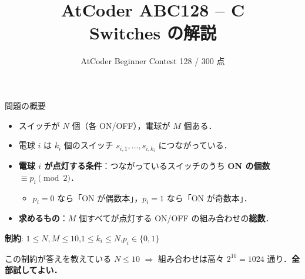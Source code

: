 \documentclass[dvipdfmx,aspectratio=169]{beamer}
\title[ABC128 C]{AtCoder ABC128 -- C\\\small Switches の解説}
\author{}
\date[ABC128]{AtCoder Beginner Contest 128 / 300 点}
\begin{document}
\begin{frame}
  \titlepage
\end{frame}

\begin{frame}{問題の概要}
  \begin{itemize}
    \item スイッチが $N$ 個（各 ON/OFF），電球が $M$ 個ある．
    \item 電球 $i$ は $k_i$ 個のスイッチ $s_{i,1},\ldots,s_{i,k_i}$ につながっている．
    \item \textbf{電球 $i$ が点灯する条件}：つながっているスイッチのうち
      \textbf{ON の個数} $\equiv p_i \pmod 2$．
      \begin{itemize}
        \item $p_i = 0$ なら「ON が偶数本」，$p_i = 1$ なら「ON が奇数本」．
      \end{itemize}
    \item \textbf{求めるもの}：$M$ 個すべてが点灯する ON/OFF の組み合わせの\textbf{総数}．
  \end{itemize}

  \vspace{0.6em}
  \textbf{制約}: $1 \le N, M \le 10$,\quad $1 \le k_i \le N$,\quad $p_i \in \{0,1\}$

  \vspace{0.4em}
  \begin{block}{この制約が答えを教えている}
    $N \le 10$ $\Rightarrow$ 組み合わせは高々 $2^{10} = 1024$ 通り．\textbf{全部試してよい．}
  \end{block}
\end{frame}
\end{document}
